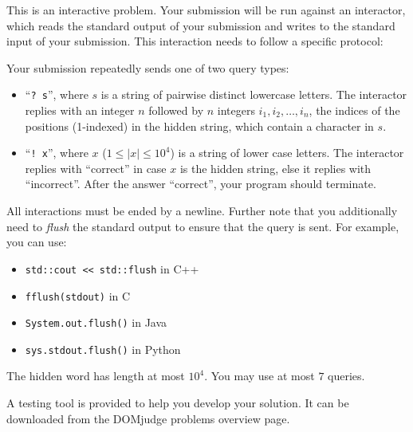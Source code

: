 \begin{Interaction}
This is an interactive problem. Your submission will be run against an interactor, which reads the standard output of your submission and writes to the standard input of your submission. This interaction needs to follow a specific protocol:
\medskip

Your submission repeatedly sends one of two query types:
\begin{itemize}
\item  ``\texttt{?~s}'', where $s$ is a string of pairwise distinct lowercase letters. The interactor replies with an integer $n$ followed by $n$ integers $i_1, i_2, \dots, i_n$, the indices of the positions (1-indexed) in the hidden string, which contain a character in $s$.
\item ``\texttt{!~x}'', where $x$ ($1 \leq |x| \leq 10^4$) is a string of lower case letters. The interactor replies with ``correct'' in case $x$ is the hidden string, else it replies with ``incorrect''. After the answer ``correct'', your program should terminate.
\end{itemize}
\medskip

All interactions must be ended by a newline.
Further note that you additionally need to \emph{flush} the standard output to ensure that the query is sent.
For example, you can use:
\begin{itemize}
\item \texttt{std::cout <{}< std::flush} in C++
\item \texttt{fflush(stdout)} in C
\item \texttt{System.out.flush()} in Java
\item \texttt{sys.stdout.flush()} in Python
\end{itemize}

The hidden word has length at most $10^4$. You may use at most $7$ queries.
\bigskip

A testing tool is provided to help you develop your solution. It can be downloaded from the DOMjudge problems overview page.
\end{Interaction}
\newpage

